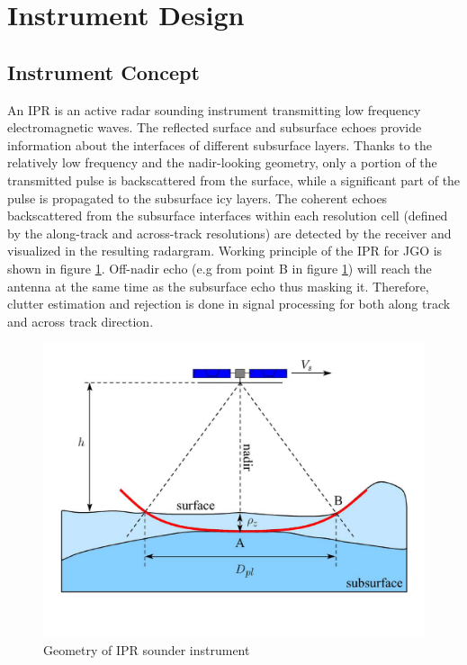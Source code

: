 \section{Instrument Design}
\label{IPR_design}
%
\subsection{Instrument Concept}
An \ac{IPR} is an active radar sounding instrument transmitting low frequency electromagnetic waves. The reflected surface and subsurface echoes provide information about the interfaces of different subsurface layers. Thanks to the relatively low frequency and the nadir-looking geometry, only a portion of the transmitted pulse is backscattered from the surface, while a significant part of the pulse is propagated to the subsurface icy layers\cite{Gany_SRS}. The coherent echoes backscattered from the subsurface interfaces within each resolution cell (defined by the along-track and across-track resolutions) are detected by the receiver and visualized in the resulting radargram\cite{Gany_SRS}. Working principle of the \ac{IPR} for \ac{JGO} is shown in figure \ref{fig:IPR_concept}. Off-nadir echo (e.g from point B in figure \ref{fig:IPR_concept}) will reach the antenna at the same time as the subsurface echo thus masking it. Therefore, clutter estimation and rejection is done in signal processing for both along track and across track direction.\\
%
\begin{figure}[bht]
\centering
\includegraphics[scale=0.5]{Figures/IPR_Concept.pdf}
\caption{Geometry of \ac{IPR} sounder instrument \cite{Gany_SRS}} 
\label{fig:IPR_concept}
\end{figure}
%

